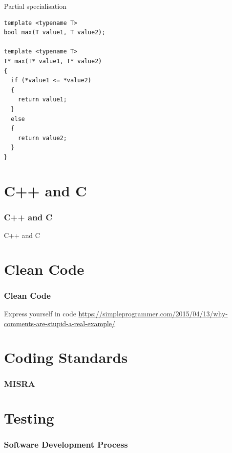 \documentclass{beamer}
\begin{document}
\begin{frame}[fragile]{Partial specialisation}
\begin{lstlisting}
template <typename T>
bool max(T value1, T value2);

template <typename T>
T* max(T* value1, T* value2)
{
  if (*value1 <= *value2)
  {
    return value1;
  } 
  else
  {
    return value2;
  }
}

\end{lstlisting}
\end{frame}

\part{C++ and C}
\section{C++ and C}
\begin{frame}{C++ and C}
\end{frame}


\part{Clean Code}
\section{Clean Code}
\begin{frame}{Express yourself in code}
\url{https://simpleprogrammer.com/2015/04/13/why-comments-are-stupid-a-real-example/}
\end{frame}


\part{Coding Standards}
\section{MISRA}
\begin{frame}

\end{frame}


\part{Testing}

\section{Software Development Process}
\end{document}
